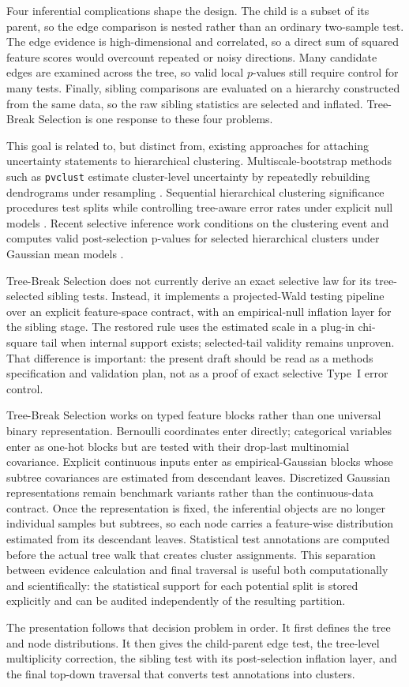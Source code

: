 Four inferential complications shape the design. The child is a subset of its
parent, so the edge comparison is nested rather than an ordinary two-sample
test. The edge evidence is high-dimensional and correlated, so a direct sum of
squared feature scores would overcount repeated or noisy directions. Many candidate edges
are examined across the tree, so valid local $p$-values still require control
for many tests. Finally, sibling comparisons are evaluated on a hierarchy
constructed from the same data, so the raw sibling statistics are selected and
inflated. Tree-Break Selection is one response to these four problems.

This goal is related to, but distinct from, existing approaches for attaching
uncertainty statements to hierarchical clustering. Multiscale-bootstrap methods
such as \texttt{pvclust} estimate cluster-level uncertainty by repeatedly
rebuilding dendrograms under resampling \citep{suzuki2006pvclust}. Sequential
hierarchical clustering significance procedures test splits while controlling
tree-aware error rates under explicit null models \citep{kimes2017statistical}.
Recent selective inference work conditions on the clustering event and computes
valid post-selection p-values for selected hierarchical clusters under Gaussian
mean models \citep{gao2024selective}.

Tree-Break Selection does not currently derive an exact selective law for its tree-selected
sibling tests. Instead, it implements a projected-Wald testing pipeline over an
explicit feature-space contract, with an empirical-null inflation layer for the
sibling stage. The restored rule uses the estimated scale in a plug-in chi-square tail
when internal support exists; selected-tail validity remains unproven. That difference is
important: the present draft should be read as a methods specification and
validation plan, not as a proof of exact selective Type~I error control.

Tree-Break Selection works on typed feature blocks rather than one universal binary
representation. Bernoulli coordinates enter directly; categorical variables
enter as one-hot blocks but are tested with their drop-last multinomial
covariance. Explicit continuous inputs enter as empirical-Gaussian blocks whose
subtree covariances are estimated from descendant leaves. Discretized Gaussian
representations remain benchmark variants rather than the continuous-data
contract.
Once the representation is fixed, the inferential objects are no longer
individual samples but subtrees, so each node carries a feature-wise
distribution estimated from its descendant leaves. Statistical test annotations
are computed before the actual tree walk that creates cluster assignments. This
separation between evidence calculation and final traversal is useful both
computationally and scientifically: the statistical support for each potential
split is stored explicitly and can be audited independently of the resulting
partition.

The presentation follows that decision problem in order. It first defines the
tree and node distributions. It then gives the child-parent edge test, the
tree-level multiplicity correction, the sibling test with its post-selection
inflation layer, and the final top-down traversal that converts test
annotations into clusters.
